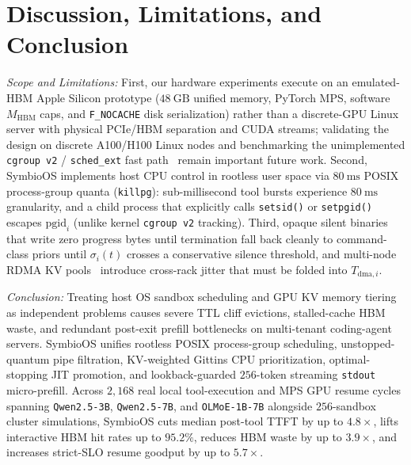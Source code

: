 \documentclass[10pt,journal,compsoc]{IEEEtran}
\theoremstyle{definition}
\theoremstyle{remark}
\newcommand{\SymbioOS}{\textup{\textsc{SymbioOS}}}
\def\SymbioOS{SymbioOS}%
\begin{document}
\section{Discussion, Limitations, and Conclusion}\label{sec:conclusion}

\emph{Scope and Limitations:} First, our hardware experiments execute on an emulated-HBM Apple Silicon prototype ($48~\mathrm{GB}$ unified memory, PyTorch MPS, software $M_{\mathrm{HBM}}$ caps, and \texttt{F\_NOCACHE} disk serialization) rather than a discrete-GPU Linux server with physical PCIe/HBM separation and CUDA streams; validating the design on discrete A100/H100 Linux nodes and benchmarking the unimplemented \texttt{cgroup v2} / \texttt{sched\_ext} fast path~\cite{zheng2026agentcgroup} remain important future work. Second, \SymbioOS{} implements host CPU control in rootless user space via $80~\mathrm{ms}$ POSIX process-group quanta (\texttt{killpg}): sub-millisecond tool bursts experience $80~\mathrm{ms}$ granularity, and a child process that explicitly calls \texttt{setsid()} or \texttt{setpgid()} escapes $\mathrm{pgid}_i$ (unlike kernel \texttt{cgroup v2} tracking). Third, opaque silent binaries that write zero progress bytes until termination fall back cleanly to command-class priors until $\sigma_i(t)$ crosses a conservative silence threshold, and multi-node RDMA KV pools~\cite{qin2025mooncake} introduce cross-rack jitter that must be folded into $T_{\mathrm{dma},i}$.

\emph{Conclusion:} Treating host OS sandbox scheduling and GPU KV memory tiering as independent problems causes severe TTL cliff evictions, stalled-cache HBM waste, and redundant post-exit prefill bottlenecks on multi-tenant coding-agent servers. \SymbioOS{} unifies rootless POSIX process-group scheduling, unstopped-quantum pipe filtration, KV-weighted Gittins CPU prioritization, optimal-stopping JIT promotion, and lookback-guarded $256$-token streaming \texttt{stdout} micro-prefill. Across $2{,}168$ real local tool-execution and MPS GPU resume cycles spanning \texttt{Qwen2.5-3B}, \texttt{Qwen2.5-7B}, and \texttt{OLMoE-1B-7B} alongside $256$-sandbox cluster simulations, \SymbioOS{} cuts median post-tool TTFT by up to $4.8\times$, lifts interactive HBM hit rates up to $95.2\%$, reduces HBM waste by up to $3.9\times$, and increases strict-SLO resume goodput by up to $5.7\times$.
\end{document}
